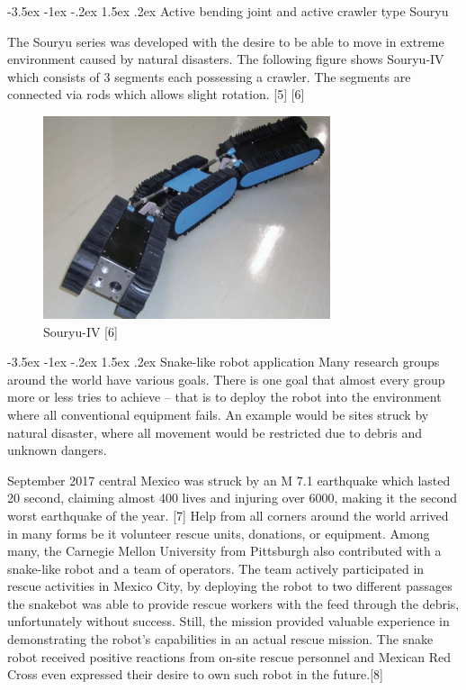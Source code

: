 \documentclass[a4paper,10pt]{article}
\makeatletter
\theoremstyle{definition}
\renewcommand\section{\@startsection {section}{1}{\z@}%
                                   {-3.5ex \@plus -1ex \@minus -.2ex}%
                                   {1.5ex \@plus.2ex}%
                                   {\large\bfseries}}
\renewcommand\subsection{\@startsection {subsection}{1}{\z@}%
                                   {-3.5ex \@plus -1ex \@minus -.2ex}%
                                   {1.5ex \@plus.2ex}%
                                   {\normalsize\bfseries}}
\makeatother
\begin{document}
\vspace*{60pt}

\subsection{Active bending joint and active crawler type}
Souryu

The Souryu series was developed with the desire to be able to move in extreme 
environment caused by natural disasters. The following figure shows Souryu-IV 
which consists of 3 segments each possessing a crawler. The segments are 
connected via rods which allows slight rotation. [5] [6]

\begin{figure}[h!]
\begin{center}
\includegraphics[scale=0.75]{image/Souryu-IV.png}
\caption{Souryu-IV [6]}
\label{}
\end{center}
\end{figure}

\section{Snake-like robot application}
Many research groups around the world have various goals. There is one goal that almost 
every group more or less tries to achieve – that is to deploy the robot into the environment 
where all conventional equipment fails. An example would be sites struck by natural 
disaster, where all movement would be restricted due to debris and unknown dangers.

September 2017 central Mexico was struck by an M 7.1 earthquake which lasted 
20 second, claiming almost 400 lives and injuring over 6000, making it the second worst 
earthquake of the year. [7] Help from all corners around the world arrived in many forms 
be it volunteer rescue units, donations, or equipment. Among many, the Carnegie Mellon 
University from Pittsburgh also contributed with a snake-like robot and a team of 
operators. The team actively participated in rescue activities in Mexico City, by deploying 
the robot to two different passages the snakebot was able to provide rescue workers with 
the feed through the debris, unfortunately without success. Still, the mission provided 
valuable experience in demonstrating the robot’s capabilities in an actual rescue mission.
The snake robot received positive reactions from on-site rescue personnel and Mexican 
Red Cross even expressed their desire to own such robot in the future.[8]
\end{document}
